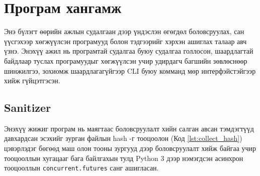 \chapter{Програм хангамж}

Энэ бүлэгт өөрийн ажлын судалгаан дээр үндэслэн өгөгдөл боловсруулах, сан үүсгэхээр хөгжүүлсэн програмууд болон тэдгээрийг хэрхэн ашиглах талаар авч үзнэ. Энэхүү ажил нь програмтай судалгаа буюу судалгаа голлосон, шаардлагтай байдлаар туслах програмуудыг хөгжүүлсэн учир удирдагч багшийн зөвлөснөөр шинжилгээ, зохиомж шаардлагагүйгээр CLI буюу комманд мөр интерфэйстэйгээр хийж гүйцэтгэсэн.

\section{Sanitizer}
\label{section:sanitizer}

Энэхүү жижиг програм нь маягтаас боловсруулалт хийн салган авсан тэмдэгтүүд давхардсан эсэхийг зурган файлын hash -г тооцоолон (Код \ref{lst:collect_hash}) цэвэрлэдэг бөгөөд маш олон тооны зургууд дээр боловсруулалт хийж байгаа учир тооцооллын хугацааг бага байлгахын тулд Python 3 \cite{python} дээр нэмэгдсэн асинхрон тооцооллын \texttt{concurrent.futures} санг ашигласан.


